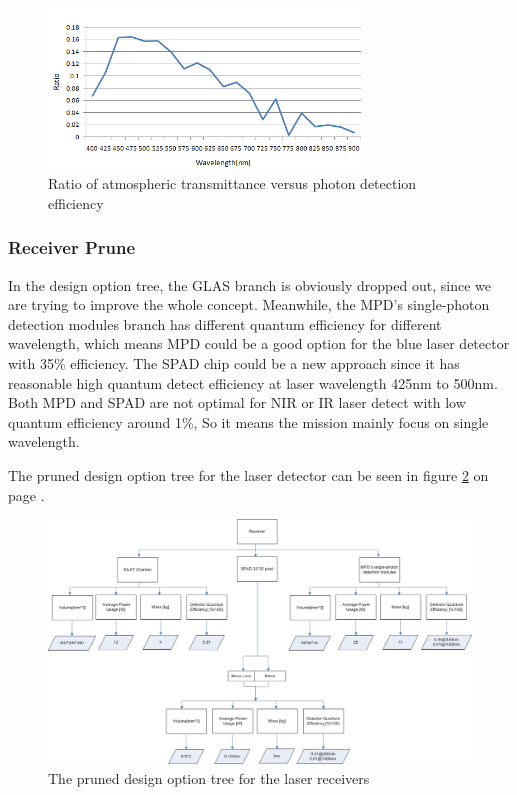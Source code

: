 \begin{figure}[ht!]
\centering
\includegraphics[width=0.75\textwidth]{chapters/img/wavelength_estimation.png}
\caption{Ratio of atmospheric transmittance versus photon detection efficiency}
\label{fig:wavelength_estimation}
\end{figure}

\subsubsection{Receiver Prune}
\label{TOReceiverP}
In the design option tree, the GLAS branch is obviously dropped out, since we are trying to improve the whole concept. Meanwhile, the \ac{MPD}'s single-photon detection modules branch has different quantum efficiency for different wavelength, which means MPD could be a good option for the blue laser detector with 35\% efficiency. The \ac{SPAD} chip could be a new approach since it has reasonable high quantum detect efficiency at laser wavelength 425nm to 500nm. Both \acs{MPD} and \acs{SPAD} are not optimal for \acs{NIR} or \acs{IR} laser detect with low quantum efficiency around 1\%, So it means the mission mainly focus on single wavelength.

The pruned design option tree for the laser detector can be seen in figure \ref{fig:PrunedReceiver} on page \pageref{fig:PrunedReceiver}.

\begin{figure}[ht!]
\centering
\includegraphics[scale=0.7, angle=90]{chapters/img/DOTreceiverPruned.jpg}
\caption{The pruned design option tree for the laser receivers}
\label{fig:PrunedReceiver}
\end{figure}

